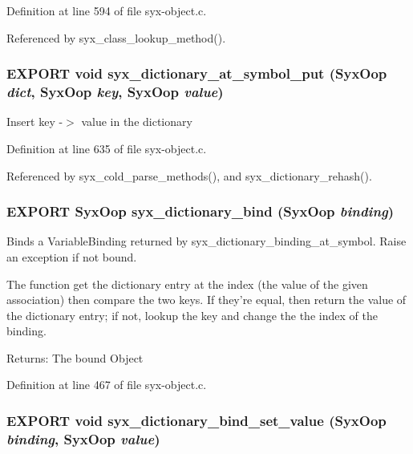 Definition at line 594 of file syx-object.c.

Referenced by syx\_\-class\_\-lookup\_\-method().\hypertarget{syx-object_8h_1a46d03f5dad054ace2cc9bbe258f62e}{
\subsubsection{\setlength{\rightskip}{0pt plus 5cm}EXPORT void syx\_\-dictionary\_\-at\_\-symbol\_\-put ({\bf SyxOop} {\em dict}, \/  {\bf SyxOop} {\em key}, \/  {\bf SyxOop} {\em value})}}
\label{syx-object_8h_1a46d03f5dad054ace2cc9bbe258f62e}


Insert key -$>$ value in the dictionary 

Definition at line 635 of file syx-object.c.

Referenced by syx\_\-cold\_\-parse\_\-methods(), and syx\_\-dictionary\_\-rehash().\hypertarget{syx-object_8h_92ca3959db07b272c56e9ba5cb22dd7a}{
\subsubsection{\setlength{\rightskip}{0pt plus 5cm}EXPORT {\bf SyxOop} syx\_\-dictionary\_\-bind ({\bf SyxOop} {\em binding})}}
\label{syx-object_8h_92ca3959db07b272c56e9ba5cb22dd7a}


Binds a VariableBinding returned by syx\_\-dictionary\_\-binding\_\-at\_\-symbol. Raise an exception if not bound.

The function get the dictionary entry at the index (the value of the given association) then compare the two keys. If they're equal, then return the value of the dictionary entry; if not, lookup the key and change the the index of the binding.

\begin{Desc}
\item[Returns:]The bound Object \end{Desc}


Definition at line 467 of file syx-object.c.\hypertarget{syx-object_8h_05356bb26948688722ef15999e182fff}{
\subsubsection{\setlength{\rightskip}{0pt plus 5cm}EXPORT void syx\_\-dictionary\_\-bind\_\-set\_\-value ({\bf SyxOop} {\em binding}, \/  {\bf SyxOop} {\em value})}}
\label{syx-object_8h_05356bb26948688722ef15999e182fff}


